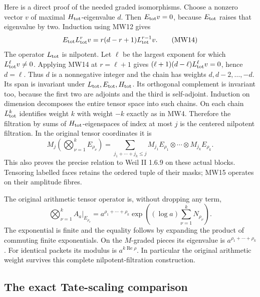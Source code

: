 Here is a direct proof of the needed graded isomorphisms.
Choose a nonzero vector \(v\) of maximal \(H_{\rm tot}\)-eigenvalue
\(d\). Then \(E_{\rm tot}v=0\), because \(E_{\rm tot}\) raises that
eigenvalue by two. Induction using MW12 gives
\[
 E_{\rm tot}L_{\rm tot}^r v
       =r(d-r+1)L_{\rm tot}^{r-1}v .
 \tag{MW14}
\]
The operator \(L_{\rm tot}\) is nilpotent. Let \(\ell\) be the
largest exponent for which \(L_{\rm tot}^\ell v\ne0\).
Applying MW14 at \(r=\ell+1\) gives
\((\ell+1)(d-\ell)L_{\rm tot}^\ell v=0\), hence \(d=\ell\).
Thus \(d\) is a nonnegative integer and the chain has weights
\(d,d-2,\ldots,-d\).
Its span is invariant under \(L_{\rm tot},E_{\rm tot},H_{\rm tot}\).
Its orthogonal complement is invariant too, because the first two
are adjoints and the third is self-adjoint. Induction on dimension
decomposes the entire tensor space into such chains.
On each chain \(L_{\rm tot}^k\) identifies weight \(k\) with weight
\(-k\) exactly as in MW4. Therefore the filtration by sums of
\(H_{\rm tot}\)-eigenspaces of index at most \(j\) is the centered
nilpotent filtration. In the original tensor coordinates it is
\[
 M_j\left(\bigotimes_{\nu=1}^k E_{\rho_\nu}\right)
   =\sum_{j_1+\cdots+j_k\leq j}
        M_{j_1}E_{\rho_1}\otimes\cdots\otimes M_{j_k}E_{\rho_k}.
 \tag{MW15}
\]
This also proves the precise relation to Weil II 1.6.9 on these
actual blocks. Tensoring labelled faces retains the ordered tuple
of their masks; MW15 operates on their amplitude fibres.

The original arithmetic tensor operator is, without dropping any term,
\[
 \bigotimes_{\nu=1}^k A_a|_{E_{\rho_\nu}}
  =a^{\rho_1+\cdots+\rho_k}
     \exp\!\left((\log a)\sum_{\nu=1}^k N_{\rho_\nu}\right).
 \tag{MW16}
\]
The exponential is finite and the equality follows by expanding
the product of commuting finite exponentials. On the \(M\)-graded
pieces its eigenvalue is \(a^{\rho_1+\cdots+\rho_k}\).
For identical packets its modulus is \(a^{k\operatorname{Re}\rho}\).
In particular the original arithmetic weight survives this complete
nilpotent-filtration construction.

\subsection{The exact Tate-scaling comparison}

